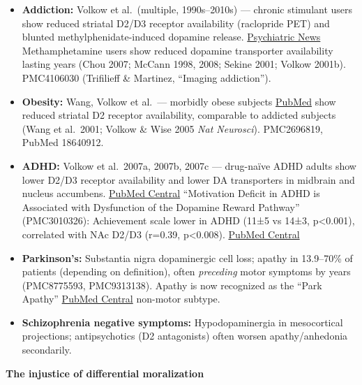 \begin{itemize}
\tightlist
\item
  \textbf{Addiction:} Volkow et al.~(multiple, 1990s--2010s) --- chronic stimulant users show reduced striatal D2/D3 receptor availability (raclopride PET) and blunted methylphenidate-induced dopamine release. \href{https://psychiatryonline.org/doi/10.1176/pn.39.11.0390032}{Psychiatric News} Methamphetamine users show reduced dopamine transporter availability lasting years (Chou 2007; McCann 1998, 2008; Sekine 2001; Volkow 2001b). PMC4106030 (Trifilieff \& Martinez, ``Imaging addiction'').
\item
  \textbf{Obesity:} Wang, Volkow et al.~--- morbidly obese subjects \href{https://pubmed.ncbi.nlm.nih.gov/18640912/}{PubMed} show reduced striatal D2 receptor availability, comparable to addicted subjects (Wang et al.~2001; Volkow \& Wise 2005 \emph{Nat Neurosci}). PMC2696819, PubMed 18640912.
\item
  \textbf{ADHD:} Volkow et al.~2007a, 2007b, 2007c --- drug-naïve ADHD adults show lower D2/D3 receptor availability and lower DA transporters in midbrain and nucleus accumbens. \href{https://pmc.ncbi.nlm.nih.gov/articles/PMC3010326/}{PubMed Central} ``Motivation Deficit in ADHD is Associated with Dysfunction of the Dopamine Reward Pathway'' (PMC3010326): Achievement scale lower in ADHD (11±5 vs 14±3, p\textless0.001), correlated with NAc D2/D3 (r=0.39, p\textless0.008). \href{https://pmc.ncbi.nlm.nih.gov/articles/PMC3010326/}{PubMed Central}
\item
  \textbf{Parkinson's:} Substantia nigra dopaminergic cell loss; apathy in 13.9--70\% of patients (depending on definition), often \emph{preceding} motor symptoms by years (PMC8775593, PMC9313138). Apathy is now recognized as the ``Park Apathy'' \href{https://pmc.ncbi.nlm.nih.gov/articles/PMC9313138/}{PubMed Central} non-motor subtype.
\item
  \textbf{Schizophrenia negative symptoms:} Hypodopaminergia in mesocortical projections; antipsychotics (D2 antagonists) often worsen apathy/anhedonia secondarily.
\end{itemize}

\textbf{The injustice of differential moralization}

